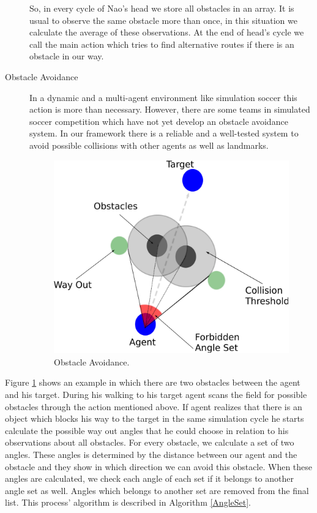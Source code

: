 \begin{description}
 So, in every cycle of Nao's head we store all obstacles in an array. It is usual to observe the same obstacle more than once, in this situation we calculate the average of these observations. At the end of head's cycle we call the main action which tries to find alternative routes if there is an obstacle in our way.
 \item[Obstacle Avoidance]
 In a dynamic and a multi-agent environment like simulation soccer this action is more than necessary. However, there are some teams in simulated soccer competition which have not yet develop an obstacle avoidance system. In our framework there is a
 reliable and a well-tested system to avoid possible collisions with other agents as well as landmarks.
  \begin{figure}[!h]
\centering
  \includegraphics[scale=0.6]{Chapter3/figures/ObstacleAvoidance.pdf}
  \caption{Obstacle Avoidance.}
  \label{fig:ObstacleAvoidance}
\end{figure} 
\end{description}
Figure \ref{fig:ObstacleAvoidance} shows an example in which there are two obstacles between the agent and his target. During his walking to his target agent scans the field for possible obstacles through the action mentioned above. If agent realizes that there is an object which blocks his way to the target in the same simulation cycle he starts calculate the possible way out angles that he could choose in relation to his observations about all obstacles. For every obstacle, we calculate a set of two angles. These angles is determined by the distance between our agent and the obstacle and they show in which direction we can avoid this obstacle. When these angles are calculated, we check each angle of each set if it belongs to another angle set as well. Angles which belongs to another set are removed from the final list. This process' algorithm is described in Algorithm \ref{AngleSet}.
